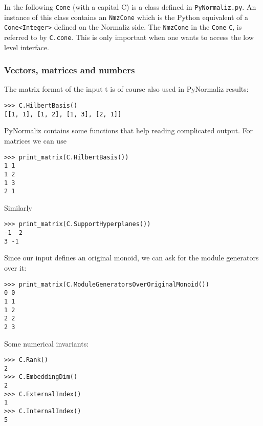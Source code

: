 \documentclass[12pt,a4paper]{scrartcl}
\theoremstyle{definition}
\begin{document}
\begin{small}
In the following \verb|Cone| (with a capital C) is a class defined in \verb|PyNormaliz.py|. An instance of this class contains an \verb|NmzCone| which is the Python equivalent of a \verb|Cone<Integer>| defined on the Normaliz side. The \verb|NmzCone| in the \verb|Cone| \verb|C|, is referred to by \verb|C.cone|. This is only important when one wants to access the low level interface.

\subsubsection{Vectors, matrices and numbers}

The matrix format of the input t is of course also used in PyNormaliz results:
\begin{Verbatim}
>>> C.HilbertBasis()
[[1, 1], [1, 2], [1, 3], [2, 1]]
\end{Verbatim}
PyNormaliz contains some functions that help reading complicated output. For matrices we can use
\begin{Verbatim}
>>> print_matrix(C.HilbertBasis())
1 1
1 2
1 3
2 1
\end{Verbatim}
Similarly
\begin{Verbatim}
>>> print_matrix(C.SupportHyperplanes())
-1  2
3 -1
\end{Verbatim}
Since our input defines an original monoid, we can ask for the module generators over it:
\begin{Verbatim}
>>> print_matrix(C.ModuleGeneratorsOverOriginalMonoid())
0 0
1 1
1 2
2 2
2 3
\end{Verbatim}
Some numerical invariants:
\begin{Verbatim}
>>> C.Rank()
2
>>> C.EmbeddingDim()
2
>>> C.ExternalIndex()
1
>>> C.InternalIndex()
5
\end{Verbatim}


\end{small}
\end{document}
